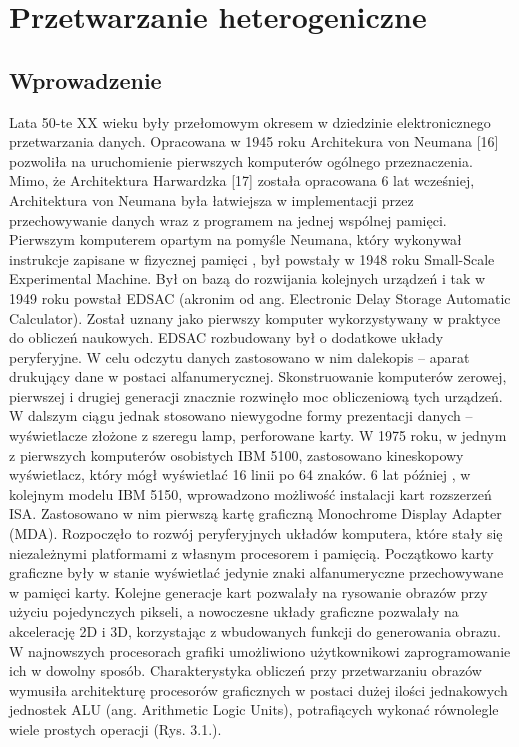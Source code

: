\chapter{Przetwarzanie heterogeniczne}\label{cha:hpo}


\section{Wprowadzenie}\label{sec:wprowadzenie}


Lata 50-te XX wieku były przełomowym okresem w dziedzinie elektronicznego przetwarzania danych. Opracowana w 1945 roku Architekura von Neumana [16] pozwoliła na uruchomienie pierwszych komputerów ogólnego przeznaczenia. Mimo, że Architektura Harwardzka [17] została opracowana 6 lat wcześniej, Architektura von Neumana była łatwiejsza w implementacji przez przechowywanie danych wraz z programem na jednej wspólnej pamięci. Pierwszym komputerem opartym na pomyśle Neumana, który wykonywał instrukcje zapisane w fizycznej pamięci , był powstały w 1948 roku Small-Scale Experimental Machine. Był on bazą do rozwijania kolejnych urządzeń i tak w 1949 roku powstał EDSAC (akronim od ang. Electronic Delay Storage Automatic Calculator). Został uznany jako  pierwszy komputer wykorzystywany w praktyce do obliczeń naukowych. EDSAC rozbudowany był o dodatkowe układy peryferyjne. W celu odczytu danych zastosowano w nim dalekopis – aparat drukujący dane w postaci alfanumerycznej. Skonstruowanie komputerów zerowej, pierwszej i drugiej generacji znacznie rozwinęło moc obliczeniową tych urządzeń. W dalszym ciągu jednak stosowano niewygodne formy prezentacji danych – wyświetlacze złożone z szeregu lamp, perforowane karty. W 1975 roku, w jednym z pierwszych komputerów osobistych IBM 5100, zastosowano kineskopowy wyświetlacz, który mógł wyświetlać 16 linii po 64 znaków. 6 lat później , w kolejnym modelu IBM 5150, wprowadzono możliwość instalacji kart rozszerzeń ISA. Zastosowano w nim pierwszą kartę graficzną Monochrome Display Adapter (MDA). Rozpoczęło to rozwój peryferyjnych układów komputera, które stały się niezależnymi platformami z własnym procesorem i pamięcią. Początkowo karty graficzne były w stanie wyświetlać jedynie znaki alfanumeryczne przechowywane w pamięci karty. Kolejne generacje kart pozwalały na rysowanie obrazów przy użyciu pojedynczych pikseli, a nowoczesne układy graficzne pozwalały na akcelerację 2D i 3D, korzystając z wbudowanych funkcji do generowania obrazu. W najnowszych procesorach grafiki umożliwiono użytkownikowi zaprogramowanie ich w dowolny sposób. Charakterystyka obliczeń przy przetwarzaniu obrazów wymusiła architekturę procesorów graficznych w postaci dużej ilości jednakowych jednostek ALU (ang. Arithmetic Logic Units), potrafiących wykonać równolegle wiele prostych operacji (Rys. 3.1.).
